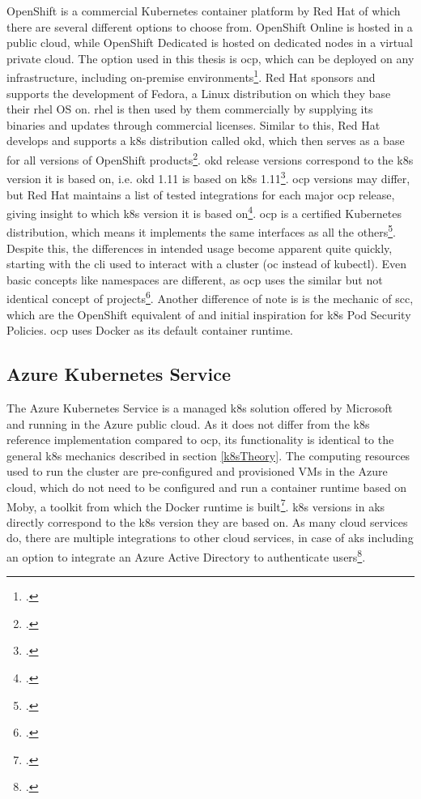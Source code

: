 OpenShift is a commercial Kubernetes container platform by Red Hat of which there are several different options to choose from. OpenShift Online is hosted in a public cloud, while OpenShift Dedicated is hosted on dedicated nodes in a virtual private cloud. The option used in this thesis is \gls{ocp}, which can be deployed on any infrastructure, including on-premise environments\footcite[][, section 'OpenShift plans and pricing']{openShiftOptions}.
Red Hat sponsors and supports the development of Fedora, a Linux distribution on which they base their \gls{rhel} OS on. \gls{rhel} is then used by them commercially by supplying its binaries and updates through commercial licenses.
Similar to this, Red Hat develops and supports a \gls{k8s} distribution called \gls{okd}, which then serves as a base for all versions of OpenShift products\footcite[][, section 'OKD vs Red Hat OpenShift']{ocpVsOkd}.
\newpage
\gls{okd} release versions correspond to the \gls{k8s} version it is based on, i.e. \gls{okd} 1.11 is based on \gls{k8s} 1.11\footcite[][, section 'What is OKD?']{okd}.
\gls{ocp} versions may differ, but Red Hat maintains a list of tested integrations for each major \gls{ocp} release, giving insight to which \gls{k8s} version it is based on\footcite[][, table 'Platform Components']{ocpK8sVersions}.
\gls{ocp} is a certified Kubernetes distribution, which means it implements the same interfaces as all the others\footcite[][, table 'Platform - Certified Kubernetes - Distribution']{certifiedK8s}.
Despite this, the differences in intended usage become apparent quite quickly, starting with the \gls{cli} used to interact with a cluster (oc instead of kubectl).
Even basic concepts like namespaces are different, as \gls{ocp} uses the similar but not identical concept of projects\footcite[][, section 'Overview']{ocpProjects}.
Another difference of note is is the mechanic of \gls{scc}, which are the OpenShift equivalent of and initial inspiration for \gls{k8s} Pod Security Policies.
\gls{ocp} uses Docker as its default container runtime.

\subsection{Azure Kubernetes Service}

The Azure Kubernetes Service is a managed \gls{k8s} solution offered by Microsoft and running in the Azure public cloud. 
As it does not differ from the \gls{k8s} reference implementation compared to \gls{ocp}, its functionality is identical to the general \gls{k8s} mechanics described in section \ref{k8sTheory}.
The computing resources used to run the cluster are pre-configured and provisioned VMs in the Azure cloud, which do not need to be configured and run a container runtime based on Moby, a toolkit from which the Docker runtime is built\footcite[][, section 'What is Moby?']{dockerMoby}.
\gls{k8s} versions in \gls{aks} directly correspond to the \gls{k8s} version they are based on.
As many cloud services do, there are multiple integrations to other cloud services, in case of \gls{aks} including an option to integrate an Azure Active Directory to authenticate users\footcite[][, first paragraph]{aadAksAuth}.

